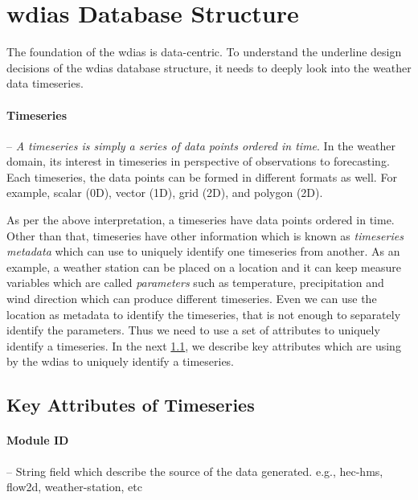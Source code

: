 \section{\acrshort{wdias} Database Structure}
\label{se:db_struct}

The foundation of the \acrshort{wdias} is data-centric. To understand the underline design decisions of the \acrshort{wdias} database structure, it needs to deeply look into the weather data timeseries.
\paragraph{Timeseries}-- \emph{A timeseries is simply a series of data points ordered in time}. In the weather domain, its interest in timeseries in perspective of observations to forecasting. Each timeseries, the data points can be formed in different formats as well. For example, scalar (0D), vector (1D), grid (2D), and polygon (2D).

As per the above interpretation, a timeseries have data points ordered in time. Other than that, timeseries have other information which is known as \emph{timeseries metadata} which can use to uniquely identify one timeseries from another. As an example, a weather station can be placed on a location and it can keep measure variables which are called \emph{parameters} such as temperature, precipitation and wind direction which can produce different timeseries. Even we can use the location as metadata to identify the timeseries, that is not enough to separately identify the parameters. Thus we need to use a set of attributes to uniquely identify a timeseries. In the next \cref{subse:timeseries_key_attributes}, we describe key attributes which are using by the \acrshort{wdias} to uniquely identify a timeseries.


\subsection{Key Attributes of Timeseries}
\label{subse:timeseries_key_attributes}
\paragraph{Module ID}-- String field which describe the source of the data generated. e.g., hec-hms, flow2d, weather-station, etc

